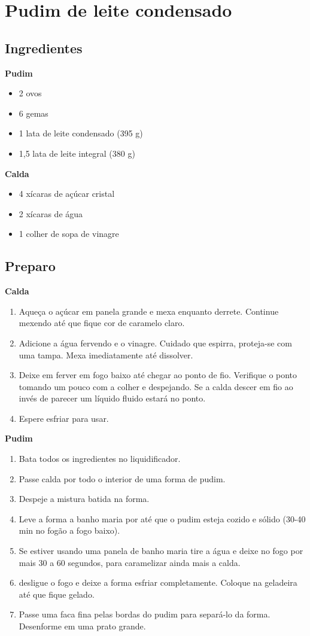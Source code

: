 \section{Pudim de leite condensado}
\subsection{Ingredientes}
\textbf{Pudim}
\begin{itemize}
\item 2 ovos
\item 6 gemas
\item 1 lata de leite condensado (395 g)
\item 1,5 lata de leite integral (380 g)
\end{itemize}
\textbf{Calda}
\begin{itemize}
\item 4 xícaras de açúcar cristal
\item 2 xícaras de água
\item 1 colher de sopa de vinagre
\end{itemize}
\subsection{Preparo}
\textbf{Calda}
\begin{enumerate}
\item Aqueça o açúcar em panela grande e mexa enquanto derrete. Continue mexendo até que fique cor de caramelo claro.
\item Adicione a água fervendo e o vinagre. Cuidado que espirra, proteja-se com uma tampa.  Mexa imediatamente até dissolver.
\item Deixe em ferver em fogo baixo até chegar ao ponto de fio. Verifique o ponto tomando um pouco com a colher e despejando. Se a calda descer em fio ao invés de parecer um líquido fluido estará no ponto.
\item Espere esfriar para usar.
\end{enumerate}
\textbf{Pudim}
\begin{enumerate}
\item Bata todos os ingredientes no liquidificador.
\item Passe calda por todo o interior de uma forma de pudim.
\item Despeje a mistura batida na forma.
\item Leve a forma a banho maria por até que o pudim esteja cozido e sólido (30-40 min no fogão a fogo baixo).
\item Se estiver usando uma panela de banho maria tire a água e deixe no fogo por mais 30 a 60 segundos, para caramelizar ainda mais a calda.
\item desligue o fogo e deixe a forma esfriar completamente. Coloque na geladeira até que fique gelado.
\item Passe uma faca fina pelas bordas do pudim para separá-lo da forma. Desenforme em uma prato grande.
\end{enumerate}
